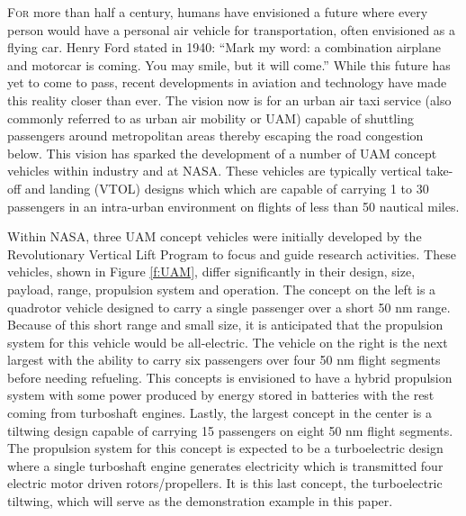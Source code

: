\lettrine{F}{or} more than half a century, humans have envisioned a future where every person would have a personal air vehicle for transportation, often envisioned as a flying car.
Henry Ford stated in 1940: ``Mark my word: a combination airplane and motorcar is coming. You may smile, but it will come.''\cite{schilling2001looking}
While this future has yet to come to pass, recent developments in aviation and technology have made this reality closer than ever. 
The vision now is for an urban air taxi service (also commonly referred to as urban air mobility or UAM) capable of shuttling passengers around metropolitan areas thereby escaping the road congestion below.\cite{moore2003personal}
This vision has sparked the development of a number of UAM concept vehicles within industry and at NASA.
These vehicles are typically vertical take-off and landing (VTOL) designs which which are capable of carrying 1 to 30 passengers in an intra-urban environment on flights of less than 50 nautical miles. 

Within NASA, three UAM concept vehicles were initially developed by the Revolutionary Vertical Lift Program to focus and guide research activities.\cite{johnson2018concept}
These vehicles, shown in Figure \ref{f:UAM}, differ significantly in their design, size, payload, range, propulsion system and operation.
The concept on the left is a quadrotor vehicle designed to carry a single passenger over a short 50 nm range.  
Because of this short range and small size, it is anticipated that the propulsion system for this vehicle would be all-electric.
The vehicle on the right is the next largest with the ability to carry six passengers over four 50 nm flight segments before needing refueling.
This concepts is envisioned to have a hybrid propulsion system with some power produced by energy stored in batteries with the rest coming from turboshaft engines.
Lastly, the largest concept in the center is a tiltwing design capable of carrying 15 passengers on eight 50 nm flight segments.
The propulsion system for this concept is expected to be a turboelectric design where a single turboshaft engine generates electricity which is transmitted four electric motor driven rotors/propellers.
It is this last concept, the turboelectric tiltwing, which will serve as the demonstration example in this paper.

